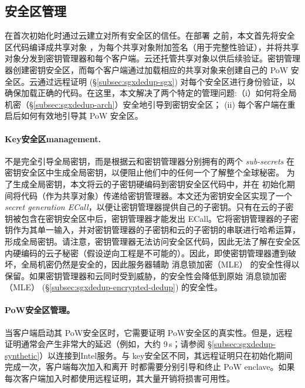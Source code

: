 \subsection{安全区管理}
\label{subsec:sgxdedup-enclave-management}

\sysnameS 在首次初始化时通过云建立对所有安全区的信任。在部署 \sysnameS 之前，本文首先将安全区代码编译成共享对象 \cite{sgx}，为每个共享对象附加签名（用于完整性验证），并将共享对象分发到密钥管理器和每个客户端。云还托管共享对象以供后续验证。密钥管理器创建密钥安全区，而每个客户端通过加载相应的共享对象来创建自己的 PoW 安全区。云通过远程证明 (\S\ref{subsec:sgxdedup-sgx}) 对每个安全区进行身份验证，以确保加载正确的代码。在这里，本文解决了两个特定的管理问题:（i）如何将全局机密（\S\ref{subsec:sgxdedup-arch}）安全地引导到密钥安全区； (ii) 每个客户端在重启后如何有效地引导其 PoW 安全区。

\paragraph*{Key安全区management.} \sysnameS 不是完全引导全局密钥，而是根据云和密钥管理器分别拥有的两个 \textit{ sub-secrets} 在密钥安全区中生成全局密钥，以便阻止他们中的任何一个了解整个全球秘密。
为了生成全局密钥，本文将云的子密钥硬编码到密钥安全区代码中，并在 \sysnameS 初始化期间将代码（作为共享对象）传递给密钥管理器。本文还为密钥安全区实现了一个\textit{ secret generation ECall}，以便让密钥管理器提供自己的子密钥。只有在云的子密钥被包含在密钥安全区中后，密钥管理器才能发出 ECall。它将密钥管理器的子密钥作为其单一输入，并对密钥管理器的子密钥和云的子密钥的串联进行哈希运算，形成全局密钥。请注意，密钥管理器无法访问安全区代码，因此无法了解在安全区内硬编码的云子秘密（假设逆向工程是不可能的）。因此，即使密钥管理器遭到破坏，全局机密仍然是安全的，因此服务器辅助 消息锁加密（MLE） 的安全性得以保留。如果密钥管理器和云同时受到威胁，\sysnameS 的安全性会降低到原始 消息锁加密（MLE） (\S\ref{subsec:sgxdedup-encrypted-dedup}) 的安全性。

\paragraph*{PoW安全区管理。} 当客户端启动其 PoW安全区时，它​​需要证明 PoW安全区的真实性。但是，远程证明通常会产生非常大的延迟（例如，大约 9\,s；请参阅 \S\ref{subsec:sgxdedup-synthetic}）以连接到Intel服务。与 key安全区不同，其远程证明只在初始化期间完成一次，客户端每次加入和离开 \sysnameS 时都需要分别引导和终止 PoW enclave。如果每次客户端加入时都使用远程证明，其大量开销将损害可用性。

